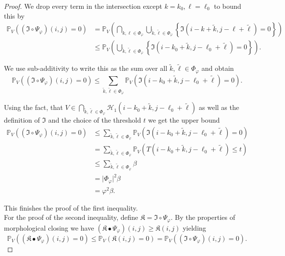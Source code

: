 \documentclass[a4paper,12pt]{article}
\newcommand{\abs}[1]{\lvert#1\rvert}
\theoremstyle{plain}
\theoremstyle{definition}
\begin{document}
\begin{proof}
	We drop every term in the intersection except $k = k_0, \ell = \ell_0$ to bound this by
	\begin{align*}
		\mathbb{P}_V\left( (\mathfrak{I} \circ \Psi_\varphi)(i, j) = 0 \right) &= \mathbb{P}_V\left( \bigcap_{k, \ell \in \Phi_\varphi} \bigcup_{\tilde{k}, \tilde{\ell} \in \Phi_\varphi} \left\{ \mathfrak{I}(i - k + \tilde{k}, j - \ell + \tilde{\ell}) = 0 \right\} \right) \\
		&\leq \mathbb{P}_V\left( \bigcup_{\tilde{k}, \tilde{\ell} \in \Phi_\varphi} \left\{ \mathfrak{I}(i - k_0 + \tilde{k}, j - \ell_0 + \tilde{\ell}) = 0 \right\} \right).
	\end{align*}
	
	We use sub-additivity to write this as the sum over all $\tilde{k}, \tilde{\ell} \in \Phi_\varphi$ and obtain
	\begin{equation*}
		\mathbb{P}_V\left( (\mathfrak{I} \circ \Psi_\varphi)(i, j) = 0 \right) \leq \sum_{\tilde{k}, \tilde{\ell} \in \Phi_\varphi} \mathbb{P}_V\left( \mathfrak{I}(i - k_0 + \tilde{k}, j - \ell_0 + \tilde{\ell}) = 0 \right).
	\end{equation*}
	
	Using the fact, that $V \in \bigcap_{\tilde{k}, \tilde{\ell} \in \Phi_\varphi} \mathcal{H}_1(i - k_0 + \tilde{k}, j - \ell_0 + \tilde{\ell})$ as well as the definition of $\mathfrak{I}$ and the choice of the threshold $t$ we get the upper bound
	\begin{align*}
		\mathbb{P}_V\left( (\mathfrak{I} \circ \Psi_\varphi)(i, j) = 0 \right) &\leq \sum_{\tilde{k}, \tilde{\ell} \in \Phi_\varphi} \mathbb{P}_V\left( \mathfrak{I}(i - k_0 + \tilde{k}, j - \ell_0 + \tilde{\ell}) = 0 \right) \\
		&= \sum_{\tilde{k}, \tilde{\ell} \in \Phi_\varphi} \mathbb{P}_V\left( T(i - k_0 + \tilde{k}, j - \ell_0 + \tilde{\ell}) \leq t \right) \\
		&\leq \sum_{\tilde{k}, \tilde{\ell} \in \Phi_\varphi} \beta \\
		&= \abs{\Phi_\varphi}^2 \beta \\
		&= \varphi^2 \beta.
	\end{align*}
	
	This finishes the proof of the first inequality.\\
	
	
	For the proof of the second inequality, define $\mathfrak{K} = \mathfrak{I} \circ \Psi_\varphi$. By the properties of morphological closing we have $(\mathfrak{K} \bullet \Psi_\varphi)(i, j) \geq \mathfrak{K}(i, j)$ yielding
	\begin{equation*}
		\mathbb{P}_V\left( (\mathfrak{K} \bullet \Psi_\varphi)(i, j) = 0 \right) \leq \mathbb{P}_V\left( \mathfrak{K}(i, j) = 0 \right) = \mathbb{P}_V\left( (\mathfrak{I} \circ \Psi_\varphi)(i, j) = 0 \right).
	\end{equation*}
	

\end{proof}
\end{document}

